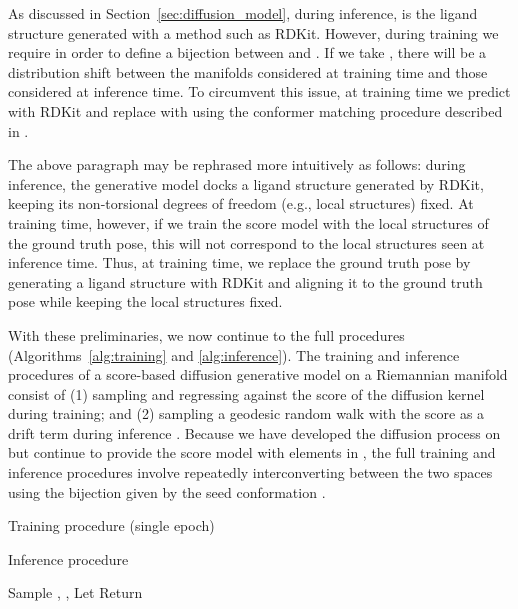 \documentclass{article} \usepackage{iclr2023_conference,times}
\begin{document}
As discussed in Section~\ref{sec:diffusion_model}, during inference,  is the ligand structure generated with a method such as RDKit. However, during training we require  in order to define a bijection between  and . If we take , there will be a distribution shift between the manifolds  considered at training time and those considered at inference time. To circumvent this issue, at training time we predict  with RDKit and replace  with  using the conformer matching procedure described in \citet{jing2022torsional}.

The above paragraph may be rephrased more intuitively as follows: during inference, the generative model docks a ligand structure generated by RDKit, keeping its non-torsional degrees of freedom (e.g., local structures) fixed. At training time, however, if we train the score model with the local structures of the ground truth pose, this will not correspond to the local structures seen at inference time. Thus, at training time, we replace the ground truth pose by generating a ligand structure with RDKit and aligning it to the ground truth pose while keeping the local structures fixed.

With these preliminaries, we now continue to the full procedures (Algorithms~\ref{alg:training} and \ref{alg:inference}). The training and inference procedures of a score-based diffusion generative model on a Riemannian manifold consist of (1) sampling and regressing against the score of the diffusion kernel during training; and (2) sampling a geodesic random walk with the score as a drift term during inference \citep{de2022riemannian}. Because we have developed the diffusion process on  but continue to provide the score model with elements in , the full training and inference procedures involve repeatedly interconverting between the two spaces using the bijection given by the seed conformation .

\begin{algorithm}[h]
\caption{Training procedure (single epoch)}\label{alg:training}
\end{algorithm}

\begin{algorithm}[h]
\caption{Inference procedure}\label{alg:inference}
Sample , , \;
Let \;
Return \;
\end{algorithm}
\end{document}
